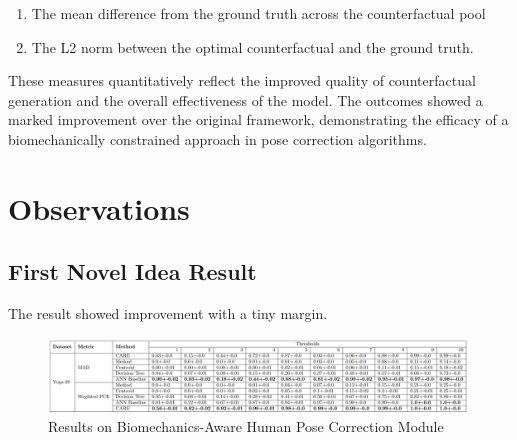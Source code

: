 \begin{itemize}
\begin{enumerate}
    \item The mean difference from the ground truth across the counterfactual pool 
    \item The L2 norm between the optimal counterfactual and the ground truth.
    \end{enumerate}
    These measures quantitatively reflect the improved quality of counterfactual generation and the overall effectiveness of the model. The outcomes showed a marked improvement over the original framework, demonstrating the efficacy of a biomechanically constrained approach in pose correction algorithms.
\end{itemize}
\section{Observations}
\subsection{First Novel Idea Result}
The result showed improvement with a tiny margin.
 \begin{figure}[H]
  \centering
    
  \includegraphics[width=\textwidth]{Images/image6.png}
  \caption{Results on Biomechanics-Aware Human Pose Correction Module}
  \label{fig:pose-stability}
\end{figure}
